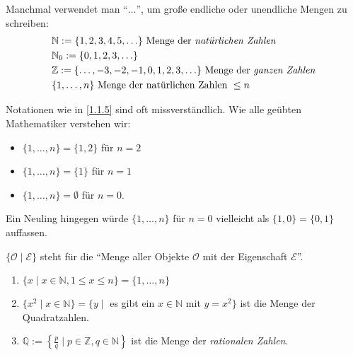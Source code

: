 \documentclass[../../main.tex]{subfiles}
\begin{document}
\begin{nt}\label{1.1.5}
Manchmal verwendet man "`$\ldots$"', um große endliche oder unendliche Mengen zu schreiben:
\begin{align*}
& \mathbb{N}:=\{1,2,3,4,5,\ldots\}\text{ Menge der \emph{natürlichen Zahlen}}\\
& \mathbb{N}_0:=\{0,1,2,3,\ldots\}\\
& \mathbb{Z}:=\{\ldots,-3,-2,-1,0,1,2,3,\ldots\}\text{ Menge der \emph{ganzen Zahlen}\index{ganze Zahlen@{\bf ganze Zahlen} ($\Z$)}}\\
& \{1,\ldots,n\}\text{ Menge der natürlichen Zahlen }\leq n
\end{align*}
\end{nt}

\begin{warning}\label{1.1.6}
Notationen wie in \ref{1.1.5} sind oft missverständlich. Wie alle geübten Mathematiker verstehen wir:
\begin{itemize}
\item $\{1,\ldots,n\}=\{1,2\}$ für $n=2$
\item $\{1,\ldots,n\}=\{1\}$ für $n=1$
\item $\{1,\ldots,n\}=\emptyset$ für $n=0$.
\end{itemize}
Ein Neuling hingegen würde $\{1,\ldots,n\}$ für $n=0$ vielleicht als $\{1,0\}=\{0,1\}$ auffassen.
\end{warning}

\begin{nt}\label{1.1.7}
$\{\mathcal{O}\mid \mathcal{E}\}$ steht für die "`Menge aller Objekte $\mathcal{O}$ mit der Eigenschaft $\mathcal{E}$"'.
\end{nt}

\begin{bsp}\label{1.1.8}
\begin{enumerate}[\normalfont(a)]
\item $\{x\mid x\in\mathbb{N}, 1\leq x\leq n\} = \{1,\ldots,n\}$
\item $\{x^2\mid x\in\mathbb{N}\}=\{y\mid$ es gibt ein $x\in\mathbb{N}$ mit $y=x^2\}$ ist die Menge der Quadratzahlen.
\item $\mathbb{Q}:= \left\{ \frac{p}{q} \mid p\in\mathbb{Z}, q\in\mathbb{N}\right\}$ ist die Menge der \emph{rationalen Zahlen}.
\end{enumerate}
\end{bsp}
\end{document}
